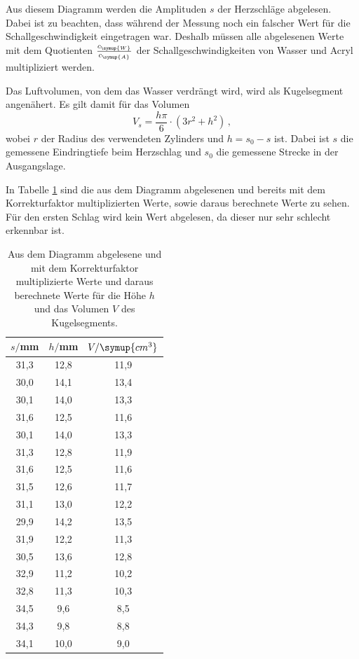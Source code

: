 Aus diesem Diagramm werden die Amplituden $s$ der Herzschläge abgelesen. Dabei
ist zu beachten, dass während der Messung noch ein falscher Wert für die Schallgeschwindigkeit
eingetragen war. Deshalb müssen alle abgelesenen Werte mit dem Quotienten
$\frac{c_{\symup{W}}}{c_{\symup{A}}}$ der Schallgeschwindigkeiten von Wasser
und Acryl multipliziert werden.

Das Luftvolumen, von dem das Wasser verdrängt wird, wird als Kugelsegment angenähert.
Es gilt damit für das Volumen
\begin{equation}
  V_s = \frac{h\pi}{6}\cdot(3r^2 + h^2) \,,
\end{equation}
wobei $r$ der Radius des verwendeten Zylinders und $h=s_0-s$ ist. Dabei ist $s$
die gemessene Eindringtiefe beim Herzschlag und $s_0$ die gemessene Strecke in
der Ausgangslage.

In Tabelle \ref{tab:herz} sind die aus dem Diagramm abgelesenen und bereits mit dem
Korrekturfaktor multiplizierten Werte, sowie daraus berechnete Werte zu sehen. Für den
ersten Schlag wird kein Wert abgelesen, da dieser nur sehr schlecht erkennbar ist.

\begin{table}[h!]
	\begin{center}
    \caption{Aus dem Diagramm abgelesene und mit dem Korrekturfaktor multiplizierte Werte und
    daraus berechnete Werte für die Höhe $h$ und das Volumen $V$ des Kugelsegments.}
    \label{tab:herz}
		\begin{tabular}{ccc}
		\toprule
			{$s/$mm} & {$h/$mm} & {$V/\symup{cm^3}$}\\
			\midrule
			31,3 & 12,8 & 11,9\\
			30,0 & 14,1 & 13,4\\
			30,1 & 14,0 & 13,3\\
			31,6 & 12,5 & 11,6\\
			30,1 & 14,0 & 13,3\\
			31,3 & 12,8 & 11,9\\
			31,6 & 12,5 & 11,6\\
			31,5 & 12,6 & 11,7\\
			31,1 & 13,0 & 12,2\\
			29,9 & 14,2 & 13,5\\
			31,9 & 12,2 & 11,3\\
			30,5 & 13,6 & 12,8\\
			32,9 & 11,2 & 10,2\\
			32,8 & 11,3 & 10,3\\
			34,5 & 9,6 & 8,5\\
			34,3 & 9,8 & 8,8\\
			34,1 & 10,0 & 9,0\\
		\bottomrule
		\end{tabular}
	\end{center}
\end{table}

